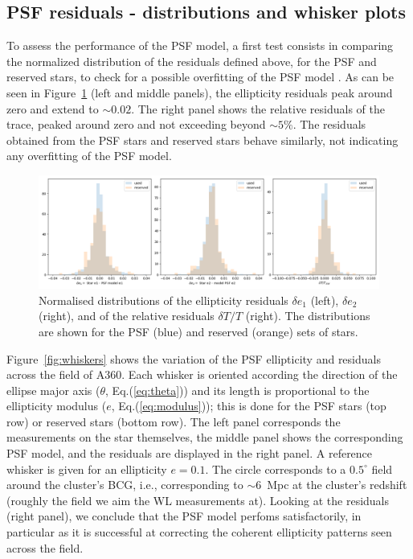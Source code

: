 \documentclass[SE,lsstdraft,authoryear,toc]{lsstdoc}
\begin{document}
\subsection{PSF residuals - distributions and whisker plots}
To assess the performance of the PSF model, a first test consists in comparing the normalized distribution of the residuals defined above, for the PSF and reserved stars, to check for a possible overfitting of the PSF model \citep{2025OJAp....8E..26S}. As can be seen in Figure~\ref{fig:residual_distrib} (left and middle panels), the ellipticity residuals peak around zero and extend to $\sim 0.02$. The right panel shows the relative residuals of the trace, peaked around zero and not exceeding beyond $\sim 5 \%$. The residuals obtained from the PSF stars and reserved stars behave similarly, not indicating any overfitting of the PSF model.

\begin{figure}
\includegraphics[width=\textwidth]{Figures/residual_histograms.png}
\caption{Normalised distributions of the ellipticity residuals $\delta e_1$ (left), $\delta e_2$ (right), and of the relative residuals $\delta T/T$ (right). The distributions are shown for the PSF (blue) and reserved (orange) sets of stars. \label{fig:residual_distrib}}
\end{figure}


Figure~\ref{fig:whiskers} shows the variation of the PSF ellipticity and residuals across the field of A360. Each whisker is oriented according the direction of the ellipse major axis ($\theta$, Eq.(\ref{eq:theta})) and its length is proportional to the ellipticity modulus ($e$, Eq.(\ref{eq:modulus})); this is done for the PSF stars (top row) or reserved stars (bottom row). The left panel corresponds the measurements on the star themselves, the middle panel shows the corresponding PSF model, and the residuals are displayed in the right panel. A reference whisker is given for an ellipticity $e = 0.1$. The circle corresponds to a $0.5^\circ$  field around the cluster’s BCG, i.e., corresponding to $\sim 6$~Mpc at the cluster's redshift (roughly the field we aim the WL measurements at). Looking at the residuals (right panel), we conclude that the PSF model perfoms satisfactorily, in particular as it is successful at correcting the coherent ellipticity patterns seen across the field.
\end{document}
